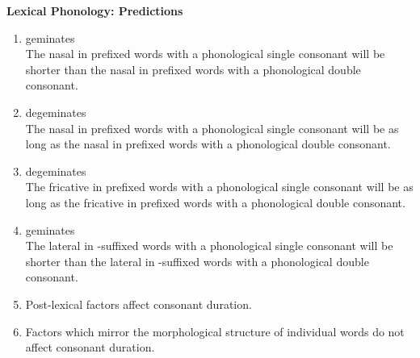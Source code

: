 \newpage
\textbf{Lexical Phonology: Predictions}

\begin{enumerate}

	\item {} geminates \\
	The nasal in prefixed words with a phonological single consonant will be shorter than the nasal in prefixed words with a phonological double consonant. %
	
	\item {} degeminates \\
	The nasal in prefixed words with a phonological single consonant will be as long as the nasal in  prefixed words with a phonological double consonant.%



	\item {} degeminates \\
	The fricative in prefixed words with a phonological single consonant will be as long as the fricative in prefixed words with a phonological double consonant. %
	

	
	\item {} geminates \\
	The lateral in -suffixed words with a phonological single consonant will be shorter than the lateral in -suffixed words with a phonological double consonant.%
	
		\item Post-lexical factors affect consonant duration.
		
		\item Factors which mirror the morphological structure of individual words do not affect consonant duration.
	
\end{enumerate}



